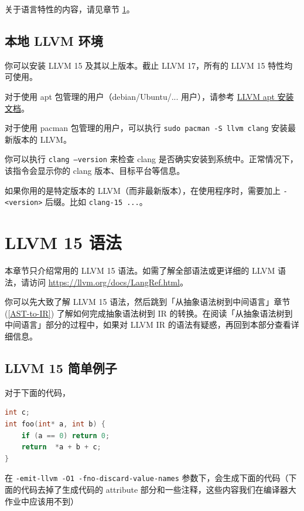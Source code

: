 关于语言特性的内容，请见章节 \ref{LLVM-semantic}。

\subsection{本地 LLVM 环境}

你可以安装 LLVM 15 及其以上版本。截止 LLVM 17，所有的 LLVM 15 特性均可使用。

对于使用 apt 包管理的用户（debian/Ubuntu/... 用户），请参考 \href{https://apt.llvm.org/}{LLVM apt 安装文档}。

对于使用 pacman 包管理的用户，可以执行 \texttt{sudo pacman -S llvm clang} 安装最新版本的 LLVM。

你可以执行 \texttt{clang --version} 来检查 clang 是否确实安装到系统中。正常情况下，该指令会显示你的
clang 版本、目标平台等信息。

\begin{remark}
如果你用的是特定版本的 LLVM（而非最新版本），在使用程序时，需要加上 \texttt{-<version>} 后缀。比如 \texttt{clang-15 ...}。
\end{remark}

\section{LLVM 15 语法}\label{LLVM-semantic}

\begin{remark}
本章节只介绍常用的 LLVM 15 语法。如需了解全部语法或更详细的 LLVM 语法，请访问
\url{https://llvm.org/docs/LangRef.html}。
\end{remark}

\begin{remark}
你可以先大致了解 LLVM 15 语法，然后跳到「从抽象语法树到中间语言」章节
(\ref{AST-to-IR}) 了解如何完成抽象语法树到 IR
的转换。在阅读「从抽象语法树到中间语言」部分的过程中，如果对 LLVM IR
的语法有疑惑，再回到本部分查看详细信息。
\end{remark}

\subsection{LLVM 15 简单例子}

对于下面的代码，
\begin{lstlisting}[language=C]
int c;
int foo(int* a, int b) {
    if (a == 0) return 0;
    return  *a + b + c;
}
\end{lstlisting}

在 \texttt{-emit-llvm -O1 -fno-discard-value-names}
参数下，会生成下面的代码（下面的代码去掉了生成代码的 attribute
部分和一些注释，这些内容我们在编译器大作业中应该用不到）

